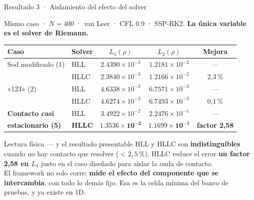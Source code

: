 \documentclass[aspectratio=169,10pt]{beamer}
\begin{document}
\begin{frame}[shrink]{Resultado 3 · Aislamiento del efecto del solver}

  \centering
  \small
  Mismo caso · $N=400$ · van Leer · CFL 0.9 · SSP-RK2.
  \textbf{La única variable es el solver de Riemann.}

  \vspace{0.4em}
  \begin{tabular}{@{}llccc@{}}
    \toprule
    \textbf{Caso} & \textbf{Solver} & $L_1(\rho)$ & $L_2(\rho)$ & \textbf{Mejora} \\
    \midrule
    Sod modificado (1) & HLL  & $2.4390\times10^{-3}$ & $1.2181\times10^{-2}$ & --- \\
                       & HLLC & $2.3840\times10^{-3}$ & $1.2166\times10^{-2}$ & 2{,}3\,\% \\
    \midrule
    «123» (2)          & HLL  & $4.6338\times10^{-3}$ & $6.7571\times10^{-3}$ & --- \\
                       & HLLC & $4.6274\times10^{-3}$ & $6.7493\times10^{-3}$ & 0{,}1\,\% \\
    \midrule
    \textbf{Contacto casi}  & HLL  & $3.4922\times10^{-2}$ & $2.2476\times10^{-1}$ & --- \\
    \textbf{estacionario (5)} & \textbf{HLLC} & $\mathbf{1.3536\times10^{-2}}$ & $\mathbf{1.1699\times10^{-1}}$ & \textbf{factor 2{,}58} \\
    \bottomrule
  \end{tabular}

  \vspace{0.6em}
  \begin{exampleblock}{Lectura física — y el resultado presentable}
    \small
    HLL y HLLC son \textbf{indistinguibles} cuando no hay contacto que resolver
    ($<2{,}5\,\%$). HLLC reduce el error \textbf{un factor 2,58 en $L_1$} justo en
    el caso diseñado para aislar la onda de contacto.
    \\[3pt]
    El framework no solo corre: \textbf{mide el efecto del componente que se
    intercambia}, con todo lo demás fijo. Esa es la celda mínima del banco de
    pruebas, y ya existe en 1D.
  \end{exampleblock}
\end{frame}
\end{document}
